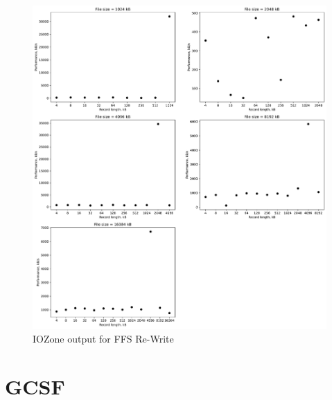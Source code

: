 \begin{figure}[!htb]
	\label{fig:app_bench_ffs_re_write}
	\begin{center}
		\includegraphics[width=1.0\textwidth]{figures/benchmarking/ffs/Re-Write.pdf}
	\end{center}
	\caption{IOZone output for FFS Re-Write}
\end{figure}


\section{GCSF}








